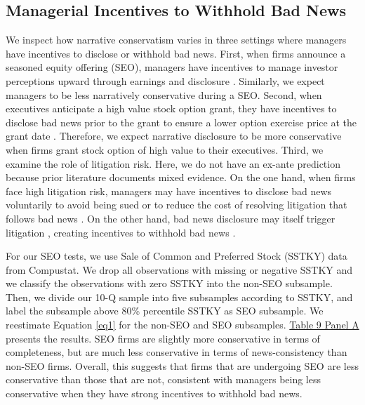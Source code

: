 \documentclass[letterpaper,12pt]{article}
\begin{document}
\begin{spacing}{1.5}
\subsection{Managerial Incentives to Withhold Bad News}
\noindent We inspect how narrative conservatism varies in three settings where managers have incentives to disclose or withhold bad news. First, when firms announce a seasoned equity offering (SEO), managers have incentives to manage investor perceptions upward through earnings \cite{teohEarningsManagementUnderperformance1998} and disclosure \cite{langVoluntaryDisclosureEquity2000}. Similarly, we expect managers to be less narratively conservative during a SEO. Second, when executives anticipate a high value stock option grant, they have incentives to disclose bad news prior to the grant to ensure a lower option exercise price at the grant date \cite{aboodyCEOStockOption2000,bakerStockOptionCompensation2003,mcanallyExecutiveStockOptions2008}. Therefore, we expect narrative disclosure to be more conservative when firms grant stock option of high value to their executives. Third, we examine the role of litigation risk. Here, we do not have an ex-ante prediction because prior literature documents mixed evidence. On the one hand, when firms face high litigation risk, managers may have incentives to disclose bad news voluntarily to avoid being sued or to reduce the cost of resolving litigation that follows bad news \cite{skinnerWhyFirmsVoluntarily1994, skinnerEarningsDisclosuresStockholder1997}. On the other hand, bad news disclosure may itself trigger litigation \cite{francisShareholderLitigationCorporate1994}, creating incentives to withhold bad news \cite{rogersShareholderLitigationChanges2009}. 

For our SEO tests, we use Sale of Common and Preferred Stock (SSTKY) data from Compustat. We drop all observations with missing or negative SSTKY and we classify the observations with zero SSTKY into the non-SEO subsample. Then, we divide our 10-Q sample into five subsamples according to SSTKY, and label the subsample above 80\% percentile SSTKY as SEO subsample. We reestimate Equation \eqref{eq1} for the non-SEO and SEO subsamples. \hyperref[T9]{Table 9 Panel A} presents the results. SEO firms are slightly more conservative in terms of completeness, but are much less conservative in terms of news-consistency than non-SEO firms. Overall, this suggests that firms that are undergoing SEO are less conservative than those that are not, consistent with managers being less conservative when they have strong incentives to withhold bad news.


\end{spacing}
\end{document}
